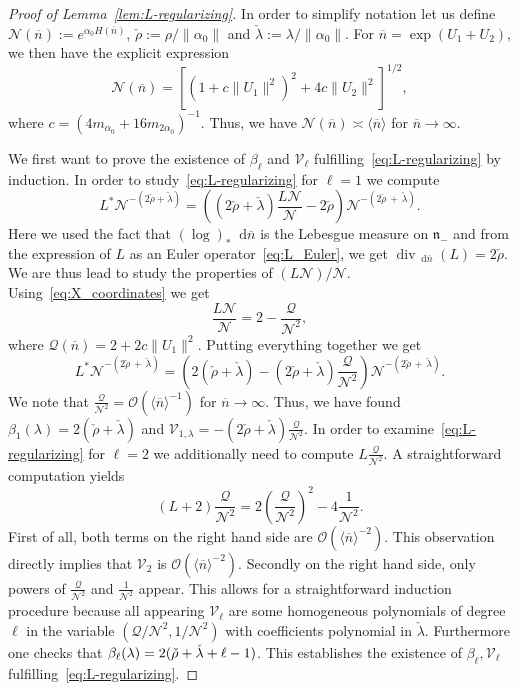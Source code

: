 \documentclass[10pt]{amsart}
\theoremstyle{definition}
\DeclareMathOperator{\Div}{div}
\newcommand{\mc}{\mathcal}
\newcommand{\la}{\lambda}
\newcommand{\intd}{\mathop{}\!\mathrm{d}}
\newcommand{\n}{\mathfrak n}
\newcommand{\bn}{{\overline{n}}}
\begin{document}
\begin{proof}[Proof of Lemma~\ref{lem:L-regularizing}]
In order to simplify notation let us define $\mc{N}(\bn):= e^{\alpha_0 H(\bn)}$, $\check \rho:=\rho/\|\alpha_0\|$ and $\check\lambda:=\lambda/\|\alpha_0\|$. For $\bn=\exp(U_1+U_2)$, we then have the explicit expression~\cite[Theorem~IX.3.8]{Hel78}
\begin{equation}\label{eq:X_coordinates}
\mc{N}(\bn) = \left[\left(1+c\|U_1\|^2\right)^2 + 4c\|U_2\|^2\right]^{1/2},
\end{equation}
where $c=(4m_{\alpha_0} + 16m_{2\alpha_0})^{-1}$. Thus, we have $\mc{N}(\bn) \asymp \langle\bn\rangle$ for $\bn\to\infty$.

We first want to prove the existence of $\beta_\ell$ and $\mathcal V_\ell$ fulfilling~\eqref{eq:L-regularizing} by induction. In order to study~\eqref{eq:L-regularizing} for $\ell=1$ we compute
\[
L^*\mc{N}^{-(2\check\rho + \check\lambda)} = \left(\left(2\check \rho+\check \lambda\right)
\frac{L\mc{N}}{\mc{N}} - 2\check \rho\right)\mc{N}^{-(2\check\rho\,+\,\check \lambda)}.
\]
Here we used the fact that $(\log)_*\intd \bn$ is the Lebesgue measure on $\n_-$ and from the expression of $L$ as an Euler operator~\eqref{eq:L_Euler}, we get $\Div_{\intd\bn}(L) = 2\check\rho$. We are thus lead to study the properties of $(L\mc{N})/\mc{N}$. Using~\eqref{eq:X_coordinates} we get
\begin{equation}\label{LN/N}
\frac{L\mc{N}}{\mc{N}} = 2-\frac{\mc{Q}}{\mc{N}^2},
\end{equation}
where $\mc{Q}(\bn) = 2+2c\|U_1\|^2$. Putting everything together we get
\begin{equation}\label{eq:lstarN}
L^*\mc{N}^{-(2\check\rho\,+\,\check\lambda)} = \left(2\left(\check\rho + \check\lambda\right) - \left(2\check\rho + \check\lambda\right) \frac{\mc{Q}}{\mc{N}^2}
\right)\mc{N}^{-(2\check\rho\,+\,\check\lambda)}.
\end{equation}
We note that $\frac{\mc{Q}}{\mc{N}^ 2} = \mc{O}(\langle \bn\rangle^{-1})$ for $\bn\to\infty$. Thus, we have found $\beta_1(\lambda) = 2(\check\rho + \check\lambda)$ and $\mathcal V_{1,\lambda}=-(2\check \rho + \check\lambda)\frac{\mc{Q}}{\mc{N}^ 2}$. In order to examine~\eqref{eq:L-regularizing} for $\ell=2$ we additionally need to compute $L\frac{\mathcal Q}{\mathcal N^2}$. A straightforward computation yields
\[
(L+2)\frac{\mc{Q}}{\mc{N}^2} = 2\left(\frac{\mc{Q}}{\mc{N}^2}\right)^2 -4\frac{1}{\mc{N}^2}.
\]
First of all, both terms on the right hand side are $\mc{O}(\langle\bn\rangle^{-2})$. This observation directly implies that $\mathcal V_2$ is $\mathcal O(\langle\bn\rangle^{-2})$. Secondly on the right hand side, only powers of $\frac{\mc{Q}}{\mc{N}^2}$ and $\frac{1}{\mc{N}^2}$ appear. This allows for a straightforward induction procedure because all appearing $\mc V_\ell$ are some homogeneous polynomials of degree $\ell$ in the variable $(\mc{Q}/\mc{N}^2,1/\mc{N}^2)$ with coefficients polynomial in $\check\la$. Furthermore one checks that $\beta_{\ell}(\la)\linebreak=2(\check\rho + \check\lambda+\ell-1)$. This establishes the existence of $\beta_\ell, \mc V_\ell$ fulfilling~\eqref{eq:L-regularizing}.


\end{proof}
\end{document}
